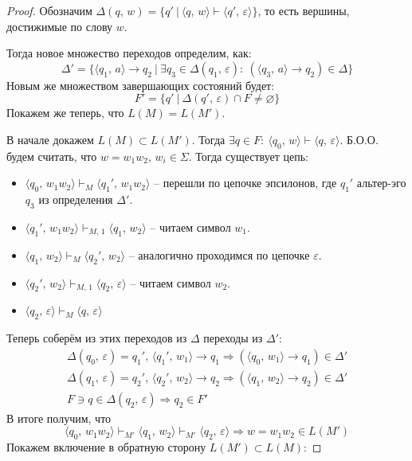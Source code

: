 \documentclass[a4paper,12pt]{article}
\renewcommand{\emptyset}{\ensuremath{\varnothing}}
\theoremstyle{plain}
\theoremstyle{definition}
\theoremstyle{remark}
\begin{document}
\begin{proof}
	Обозначим $\Delta(q,\, w) = \{q' \:|\: \langle q,\, w\rangle \vdash \langle q',\, \varepsilon\rangle\}$, то есть вершины, достижимые по слову $w$.

	Тогда новое множество переходов определим, как:
	\[
		\Delta' = \{\langle q_1,\, a\rangle \to q_2 \:|\: \exists q_3 \in \Delta(q_1,\,\varepsilon) :\: (\langle q_3,\, a\rangle \to q_2) \in \Delta\}
	\]
	Новым же множеством завершающих состояний будет:
	\[
		F' = \{q' \:|\: \Delta(q',\, \varepsilon) \cap F \neq \emptyset\}
	\]
	Покажем же теперь, что $L(M) = L(M')$.

	В начале докажем $L(M) \subset L(M')$. Тогда $\exists q \in F :\: \langle q_0,\, w\rangle \vdash \langle q,\, \varepsilon\rangle$. Б.О.О. будем считать, что $w = w_1w_2,\, w_i \in \Sigma$. Тогда существует цепь:
	\begin{itemize}
		\item $\langle q_0,\, w_1w_2\rangle \vdash_M \langle q_1',\, w_1w_2\rangle$ -- перешли по цепочке эпсилонов, где $q_1'$ альтер-эго $q_3$ из определения $\Delta'$.
		\item $\langle q_1',\, w_1w_2\rangle \vdash_{M,\, 1} \langle q_1,\, w_2\rangle$ -- читаем символ $w_1$.
		\item $\langle q_1,\, w_2\rangle \vdash_M \langle q_2',\, w_2\rangle$ -- аналогично проходимся по цепочке $\varepsilon$.
		\item $\langle q_2',\, w_2\rangle \vdash_{M,\, 1} \langle q_2,\, \varepsilon\rangle$ -- читаем символ $w_2$.
		\item $\langle q_2,\, \varepsilon\rangle \vdash_M \langle q,\, \varepsilon\rangle$
	\end{itemize}
	Теперь соберём из этих переходов из $\Delta$ переходы из $\Delta'$:
	\begin{align*}
		\Delta(q_0,\, \varepsilon) = q_1',\, \langle q_1',\, w_1\rangle \to q_1 \Rightarrow (\langle q_0,\, w_1\rangle \to q_1) \in \Delta' \\
		\Delta(q_1,\, \varepsilon) = q_2',\, \langle q_2',\, w_2\rangle \to q_2 \Rightarrow (\langle q_1,\, w_2\rangle \to q_2) \in \Delta' \\
		F \ni q \in \Delta(q_2,\, \varepsilon) \Rightarrow q_2 \in F'
	\end{align*}
	В итоге получим, что
	\[
		\langle q_0,\, w_1w_2\rangle \vdash_{M'} \langle q_1,\, w_2\rangle \vdash_{M'} \langle q_2,\, \varepsilon\rangle \Rightarrow w = w_1w_2 \in L(M')
	\]
	Покажем включение в обратную сторону $L(M') \subset L(M)$:


\end{proof}
\end{document}
